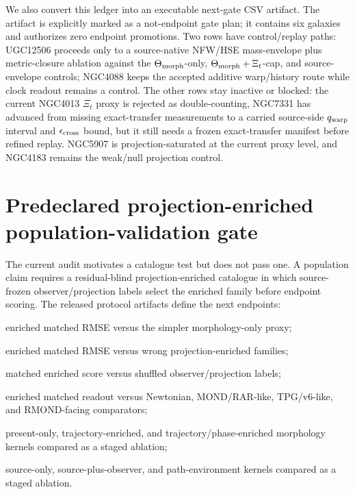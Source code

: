 \documentclass[11pt]{article}
\begin{document}
We also convert this ledger into an executable next-gate CSV artifact.  The
artifact is explicitly marked as a not-endpoint gate plan; it contains six
galaxies and authorizes zero endpoint promotions.  Two rows
have control/replay paths: UGC12506 proceeds only to a source-native
NFW/HSE mass-envelope plus metric-closure ablation against the
\(\Theta_{\rm morph}\)-only, \(\Theta_{\rm morph}+\Xi_t\)-cap, and
source-envelope controls; NGC4088 keeps the accepted additive warp/history
route while clock readout remains a control.  The other rows stay inactive or
blocked: the current NGC4013 \(\Xi_t\) proxy is rejected as double-counting,
NGC7331 has advanced from missing exact-transfer measurements to a carried
source-side \(q_{\rm warp}\) interval and \(\epsilon_{\rm cross}\) bound, but it
still needs a frozen exact-transfer manifest before refined replay.  NGC5907 is
projection-saturated at the current proxy level, and NGC4183 remains the
weak/null projection control.

\section{Predeclared projection-enriched population-validation gate}
\label{sec:population-gate}

The current audit motivates a catalogue test but does not pass one.  A
population claim requires a residual-blind projection-enriched catalogue in
which source-frozen observer/projection labels select the enriched family before
endpoint scoring.  The released protocol artifacts define the next endpoints:
\begin{description}[leftmargin=*]
  \item[\texttt{DELTA\_ENRICHED\_SIMPLER}] enriched matched RMSE versus the
  simpler morphology-only proxy;
  \item[\texttt{DELTA\_ENRICHED\_WRONG}] enriched matched RMSE versus wrong
  projection-enriched families;
  \item[\texttt{SHUFFLED\_PROJECTION\_LABEL\_NULL}] matched enriched score
  versus shuffled observer/projection labels;
  \item[\texttt{BASELINE\_COMPETITIVENESS}] enriched matched readout versus
  Newtonian, MOND/RAR-like, TPG/v6-like, and RMOND-facing comparators;
  \item[\texttt{TRAJECTORY\_PHASE\_ABLATION}] present-only, trajectory-enriched,
  and trajectory/phase-enriched morphology kernels compared as a staged
  ablation;
  \item[\texttt{PATH\_ENVIRONMENT\_ABLATION}] source-only, source-plus-observer,
  and path-environment kernels compared as a staged ablation.
\end{description}
\end{document}
